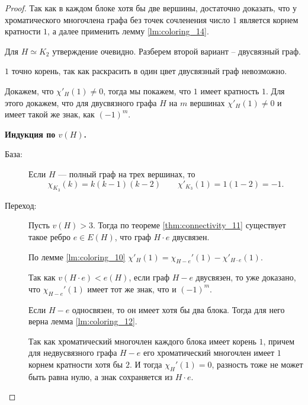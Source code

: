 \begin{proof}
	Так как в каждом блоке хотя бы две вершины, достаточно доказать, что у хроматического многочлена графа без точек сочленения число $1$ является корнем кратности $1$, а далее применить лемму \ref{lm:coloring_14}. 

	Для $H \simeq K_2$ утверждение очевидно. Разберем второй вариант -- двусвязный граф. 

	$1$ точно корень,  так как раскрасить в один цвет двусвязный граф невозможно.

	Докажем, что $\chi'_{H}(1) \neq 0$, тогда мы покажем, что $1$ имеет кратность $1$.
	Для этого докажем, что для двусвязного графа $H$ на $m$ вершинах $\chi'_H(1) \neq 0$ и имеет такой же знак, как $(-1)^{m}$.

	\textbf{Индукция по $v(H)$.}
	
	\begin{description}
		\item[База:]
			Если $H$ --- полный граф на трех вершинах, то 
			\[
			\chi_{K_3}(k) = k(k-1)(k-2) \qquad \chi'_{K_3}(1) = 1(1-2) = -1
			.\] 
		\item[Переход:] Пусть $v(H)>3$. Тогда по теореме \ref{thm:connectivity_11} существует такое ребро $e \in E(H)$, что граф $H \cdot e$ двусвязен.

			По лемме \ref{lm:coloring_10} $\chi'_{H}(1) = \chi_{H-e}'(1) - \chi'_{H \cdot e} (1)$.

			Так как $v(H \cdot e) < e(H)$, если граф $H-e$ двусвязен, то уже доказано, что $\chi_{H-e}'(1)$ имеет тот же знак, что и $(-1)^{m}$.

			Если $H-e$ односвязен, то он имеет хотя бы два блока. Тогда для него верна лемма \ref{lm:coloring_12}.

			Так как хроматический многочлен каждого блока имеет корень $1$, причем для недвусвязного графа $H-e$ его хроматический многочлен имеет $1$ корнем кратности хотя бы $2$. И тогда $\chi_H'(1) = 0$, разность тоже не может быть равна нулю, а знак сохраняется из $H \cdot e$.
	\end{description}
\end{proof}
